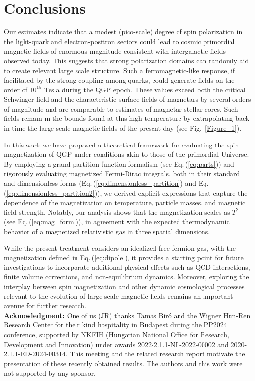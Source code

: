 \documentclass[epjST]{svjour}
\newcommand{\req}[1]{Eq.\,(\ref{#1})}
\begin{document}
\section{Conclusions}
\label{sec:conclusions}
Our estimates indicate that a modest (pico-scale) degree of spin polarization in the light-quark and electron-positron sectors could lead to cosmic primordial magnetic fields of enormous magnitude consistent with intergalactic fields observed today. This suggests that strong polarization domains can randomly aid to create relevant large scale structure. Such a ferromagnetic-like response, if facilitated by the strong coupling among quarks, could generate fields on the order of \(10^{15}\) Tesla during the QGP epoch. These values exceed both the critical Schwinger field and the characteristic surface fields of magnetars by several orders of magnitude and are comparable to estimates of magnetar stellar cores. Such fields remain in the bounds found at this high temperature by extrapolating back in time the large scale magnetic fields of the present day (see Fig.~\ref{Figure_1}).

In this work we have proposed a theoretical framework for evaluating the spin magnetization of QGP under conditions akin to those of the primordial Universe. By employing a grand partition function formalism (see \req{eq:parts}) and rigorously evaluating magnetized Fermi-Dirac integrals, both in their standard and dimensionless forms (\req{eq:dimensionless_partition} and \req{eq:dimensionless_partition2}), we derived explicit expressions that capture the dependence of the magnetization on temperature, particle masses, and magnetic field strength. Notably, our analysis shows that the magnetization scales as \(T^2\) (see \req{eq:mag_form}), in agreement with the expected thermodynamic behavior of a magnetized relativistic gas in three spatial dimensions.

While the present treatment considers an idealized free fermion gas, with the magnetization defined in \req{eq:dipole}, it provides a starting point for future investigations to incorporate additional physical effects such as QCD interactions, finite volume corrections, and non-equilibrium dynamics. Moreover, exploring the interplay between spin magnetization and other dynamic cosmological processes relevant to the evolution of large-scale magnetic fields remains an important avenue for further research.\\

\textbf{Acknowledgment:} 
One of us (JR) thanks Tamas Bir\'o and the Wigner Hun-Ren Research Center for their kind hospitality in Budapest during the PP2024 conference, supported by NKFIH (Hungarian National Office for Research, Development and Innovation) under awards 2022-2.1.1-NL-2022-00002 and 2020-2.1.1-ED-2024-00314. This meeting and the related research report motivate the presentation of these recently obtained results. The authors and this work were not supported by any sponsor.



\end{document}
